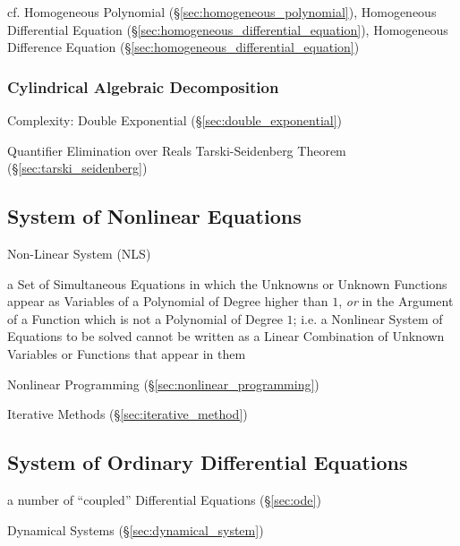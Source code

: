 cf. Homogeneous Polynomial (\S\ref{sec:homogeneous_polynomial}), Homogeneous
Differential Equation (\S\ref{sec:homogeneous_differential_equation}),
Homogeneous Difference Equation (\S\ref{sec:homogeneous_differential_equation})



\subsubsection{Cylindrical Algebraic Decomposition}
\label{sec:cylindrical_algebraic_decomposition}

Complexity: Double Exponential (\S\ref{sec:double_exponential})

Quantifier Elimination over Reals \fist Tarski-Seidenberg Theorem
(\S\ref{sec:tarski_seidenberg})



\subsection{System of Nonlinear Equations}
\label{sec:system_of_nonlinear_equations}

Non-Linear System (NLS)

a Set of Simultaneous Equations in which the Unknowns or Unknown Functions
appear as Variables of a Polynomial of Degree higher than $1$, \emph{or} in the
Argument of a Function which is not a Polynomial of Degree $1$; i.e. a
Nonlinear System of Equations to be solved cannot be written as a Linear
Combination of Unknown Variables or Functions that appear in them

\fist Nonlinear Programming (\S\ref{sec:nonlinear_programming})

\fist Iterative Methods (\S\ref{sec:iterative_method})



\subsection{System of Ordinary Differential Equations}
\label{sec:system_of_odes}

a number of ``coupled'' Differential Equations (\S\ref{sec:ode})

\fist Dynamical Systems (\S\ref{sec:dynamical_system})

